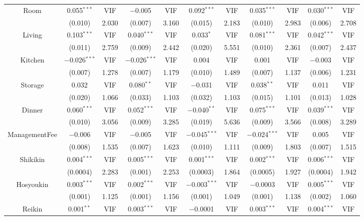 \documentclass[a4paper, 12pt]{article} %
\begin{document}
\begin{landscape}
\begin{longtable}[c]{ccccccccccc}
\addlinespace[0.5em]
Room & 0.055$^{***}$ & VIF & $-$0.005 & VIF & 0.092$^{***}$ & VIF & 0.035$^{***}$ & VIF & 0.030$^{***}$ & VIF \\
& (0.010) & 2.030 & (0.007) & 3.160 & (0.015) & 2.183 & (0.010) & 2.983 & (0.006) & 2.708 \\
\addlinespace[0.5em]
Living & 0.103$^{***}$ & VIF & 0.040$^{***}$ & VIF & 0.033$^{*}$ & VIF & 0.081$^{***}$ & VIF & 0.042$^{***}$ & VIF \\
& (0.011) & 2.759 & (0.009) & 2.442 & (0.020) & 5.551 & (0.010) & 2.361 & (0.007) & 2.437 \\
\addlinespace[0.5em]
Kitchen & $-$0.026$^{***}$ & VIF & $-$0.026$^{***}$ & VIF & 0.004 & VIF &0.001 & VIF & $-$0.003 & VIF \\
& (0.007) & 1.278 & (0.007) & 1.179 & (0.010) & 1.489 & (0.007) & 1.137 & (0.006) & 1.231 \\
\addlinespace[0.5em]
Storage & 0.032 & VIF & 0.080$^{**}$ & VIF & $-$0.031 & VIF & 0.038$^{**}$ & VIF & 0.011 & VIF \\
& (0.020) & 1.066 & (0.033) & 1.103 & (0.032) & 1.103 & (0.015) & 1.101 & (0.013) & 1.028 \\
\addlinespace[0.5em]
Dinner & 0.060$^{***}$ & VIF & 0.052$^{***}$ & VIF & $-$0.040$^{**}$ & VIF & 0.075$^{***}$ & VIF & 0.039$^{***}$ & VIF \\
& (0.010) & 3.056 & (0.009) & 3.285 & (0.019) & 5.636 & (0.009) & 3.566 & (0.008) & 3.289 \\
\addlinespace[0.5em]
ManagementFee & $-$0.006 & VIF & $-$0.005 & VIF & $-$0.045$^{***}$ & VIF & $-$0.024$^{***}$ & VIF & 0.005 & VIF \\
& (0.008) & 1.535 & (0.007) & 1.623 & (0.010) & 1.111 & (0.009) & 1.803 & (0.007) & 1.515 \\
\addlinespace[0.5em]
Shikikin & 0.004$^{***}$ & VIF & 0.005$^{***}$ & VIF & 0.001$^{***}$ & VIF & 0.002$^{***}$ & VIF & 0.006$^{***}$ & VIF \\
& (0.0004) & 2.283 & (0.001) & 2.253 & (0.0003) & 1.864 & (0.0005) & 1.927 & (0.0004) & 1.942 \\
\addlinespace[0.5em]
Hosyoukin & 0.003$^{***}$ & VIF & 0.002$^{***}$ & VIF & $-$0.003$^{***}$ & VIF & $-$0.0003 &VIF & 0.005$^{***}$ & VIF \\
& (0.001) & 1.125 & (0.001) & 1.156 & (0.001) & 1.049 & (0.001) & 1.138 & (0.002) & 1.060 \\
\addlinespace[0.5em]
Reikin & 0.001$^{**}$ & VIF & 0.003$^{***}$ & VIF & $-$0.0001 & VIF & 0.003$^{***}$ & VIF & 0.004$^{***}$ & VIF \\

\end{longtable}
\end{landscape}
\end{document}
